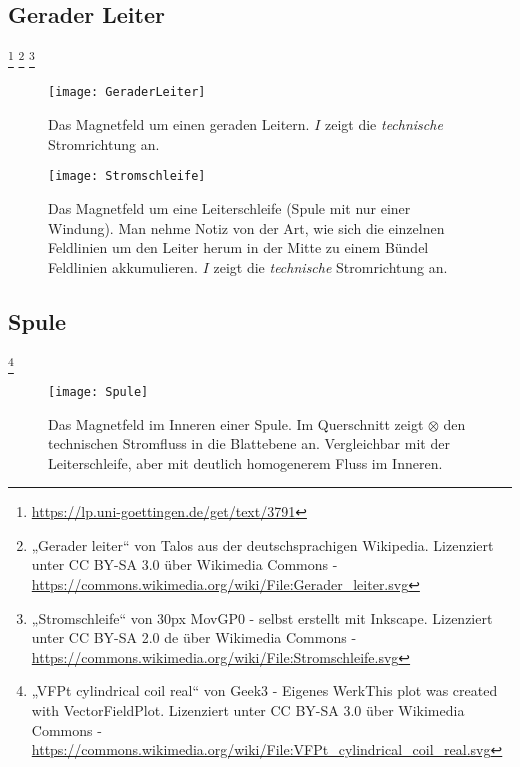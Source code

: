 \subsection{Gerader Leiter} 
\footnote{\url{https://lp.uni-goettingen.de/get/text/3791}} 
\footnote{„Gerader leiter“ von Talos aus der deutschsprachigen Wikipedia. Lizenziert unter CC BY-SA 3.0 über Wikimedia Commons - \url{https://commons.wikimedia.org/wiki/File:Gerader_leiter.svg}} 
\footnote{„Stromschleife“ von 30px MovGP0 - selbst erstellt mit Inkscape. Lizenziert unter CC BY-SA 2.0 de über Wikimedia Commons - \url{https://commons.wikimedia.org/wiki/File:Stromschleife.svg}} 
\label{subsec:GeraderLeiterFeld}

\hfill

\begin{figure}[ht!]
	\centering
	\begin{minipage}[b]{0.4\linewidth}
   	\texttt{[image: GeraderLeiter]}
		\caption{Das Magnetfeld um einen geraden Leitern. $I$ zeigt die \emph{technische} Stromrichtung an.}
	\end{minipage}
	\quad
	\begin{minipage}[b]{0.4\linewidth}
    	\texttt{[image: Stromschleife]}
	\caption{Das Magnetfeld um eine Leiterschleife (Spule mit nur einer Windung). Man nehme Notiz von der Art, wie sich die einzelnen Feldlinien um den Leiter herum in der Mitte zu einem Bündel Feldlinien akkumulieren. $I$ zeigt die \emph{technische} Stromrichtung an.}
	\end{minipage}
\end{figure}

\newpage

\subsection{Spule} \label{subsec:MFeldSpule}
\footnote{„VFPt cylindrical coil real“ von Geek3 - Eigenes WerkThis plot was created with VectorFieldPlot. Lizenziert unter CC BY-SA 3.0 über Wikimedia Commons - \url{https://commons.wikimedia.org/wiki/File:VFPt_cylindrical_coil_real.svg}}
\label{subsec:Spule}

\hfill

\begin{figure}[ht!]
	\centering
   	\texttt{[image: Spule]}
		\caption{Das Magnetfeld im Inneren einer Spule. Im Querschnitt zeigt $\otimes$ den technischen Stromfluss in die Blattebene an. Vergleichbar mit der Leiterschleife, aber mit deutlich homogenerem Fluss im Inneren.}
\end{figure}



